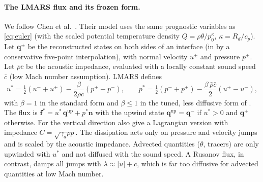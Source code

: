 \documentclass[11pt,a4paper]{article}
\theoremstyle{definition}
\theoremstyle{remark}
\begin{document}
\paragraph{The LMARS flux and its frozen form.}
We follow Chen et al.\ \cite{Chen2013}. Their model uses the same
prognostic variables as \eqref{eq:euler} (with the scaled potential
temperature density $Q=\rho\theta/p_0^{\kappa}$, $\kappa=R_d/c_p$). Let
$\mathbf q^\pm$ be the reconstructed states on both sides of an interface
(in \cite{Chen2013} by a conservative five-point interpolation), with
normal velocity $u^\pm$ and pressure $p^\pm$. Let $\bar\rho\bar c$ be
the acoustic impedance, evaluated with a locally constant sound speed
$\bar c$ (low Mach number assumption). LMARS defines
\begin{equation*}
 u^*=\tfrac12(u^-+u^+)-\frac{\beta}{2\bar\rho\bar c}(p^+-p^-),\qquad
 p^*=\tfrac12(p^-+p^+)-\frac{\beta\,\bar\rho\bar c}{2}(u^+-u^-),
\end{equation*}
with $\beta=1$ in the standard form and $\beta\le1$ in the tuned, less
diffusive form of \cite{Chen2013}. The flux is
$\mathbf f^*=u^*\,\mathbf q^{\mathrm{up}}+p^*\mathbf n$ with the upwind
state $\mathbf q^{\mathrm{up}}=\mathbf q^-$ if $u^*>0$ and $\mathbf q^+$
otherwise. For the vertical direction \cite{Chen2013} also give a
Lagrangian version with impedance $C=\sqrt{\gamma_a\rho p}$. The dissipation acts only on pressure and
velocity jumps and is scaled by the acoustic impedance. Advected
quantities ($\theta$, tracers) are only upwinded with $u^*$ and not
diffused with the sound speed. A Rusanov flux, in contrast, damps all
jumps with $\lambda\approx|u|+c$, which is far too diffusive for advected
quantities at low Mach number.
\end{document}
